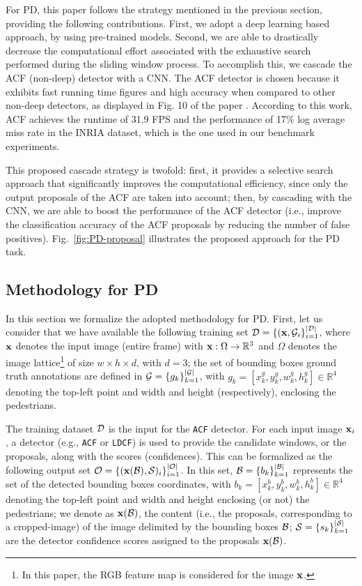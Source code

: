 \documentclass[5p,time]{elsarticle}
\begin{document}
For PD, this paper follows the strategy mentioned in the previous section, providing the following contributions. First, we adopt a deep learning based approach, by using pre-trained models.
Second, we are able to drastically decrease the computational effort associated with the exhaustive search performed during the sliding window process.
To accomplish this, we cascade the ACF (non-deep) detector \cite{DollarPAMI2014} with a CNN.
The ACF detector is chosen because it exhibits fast running time figures and high  accuracy when compared to other non-deep detectors, as displayed in  Fig. 10 of the paper \cite{DollarPAMI2014}. According to this work, ACF achieves the runtime of 31.9 FPS and the performance of 17$\%$ log average miss rate in the INRIA dataset, which is the one used in our benchmark experiments.

This proposed cascade strategy is twofold: first, it provides a selective search approach that significantly improves the computational efficiency, since only the output proposals of the ACF are taken into account; then, by cascading with the CNN, we are able to boost the performance of the ACF detector (i.e., improve the classification accuracy of the ACF proposals by reducing the number of false positives).
Fig.~\ref{fig:PD-proposal} illustrates the proposed approach for the PD task.

\subsection{Methodology for PD}
\label{sec:Methodology-for-PD}

In this section we formalize the adopted methodology for PD. First, let us consider that we have available
the following training set ${\cal D}=\{ ({\bf x},{\cal G}_i\}_{i=1}^{|\cal D|}$, where ${\bf x}$ denotes the input image (entire frame) with ${\bf x}:\Omega\rightarrow\mathbb{R}^3$ and $\Omega$ denotes the image lattice\footnote{In this paper, the RGB feature map is considered for the image ${\bf x}$.} of size $w \times h\times d$, with $d=3$; the set of bounding boxes ground truth annotations are defined in ${\cal G}=\{g_k\}_{k=1}^{|{\cal G}|}$, with $g_k=[x^g_k,y^g_k,w^g_k,h^g_k]\in\mathbb{R}^{4}$ denoting the top-left point and width and height (respectively), enclosing the pedestrians.

The training dataset ${\cal D}$ is the input for the \texttt{ACF} detector.
For each input image ${\bf x}_i$, a detector (e.g., \texttt{ACF} or \texttt{LDCF}) is used to provide the candidate windows, or the proposals, along with the scores (confidences). This can be formalized as the following output set ${\cal O}=\{ ({\bf x}({\cal B}), {\cal S})_i\}_{i=1}^{|\cal O|}$. In this set, ${\cal B} = \{b_k\}_{k=1}^{|{\cal B}|}$
represents the set of the detected bounding boxes coordinates, with $b_k=[x^b_k,y^b_k,w^b_k,h^b_k]\in\mathbb{R}^{4}$ denoting the top-left point and width and height enclosing (or not) the pedestrians; we denote as ${\bf x}({\cal B})$, the content (i.e., the proposals, corresponding to a cropped-image) of the image delimited by the bounding boxes ${\cal B}$; ${\cal S}=\{s_k\}_{k=1}^{|{\cal S}|}$ are the detector confidence scores assigned to the proposals ${\bf x}({\cal B})$.
\end{document}
